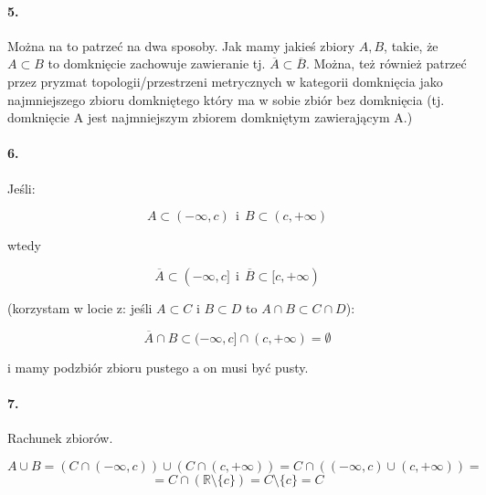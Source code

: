 \documentclass{article}
\begin{document}
\paragraph{5.}
Można na to patrzeć na dwa sposoby. Jak mamy jakieś zbiory \(A, B\), takie, że \(A \subset B\) to domknięcie zachowuje zawieranie tj.
\(\overline{A} \subset \overline{B}\). Można, też również patrzeć przez pryzmat topologii/przestrzeni metrycznych w kategorii
domknięcia jako najmniejszego zbioru domkniętego który ma w sobie zbiór bez domknięcia (tj. domknięcie A jest najmniejszym zbiorem domkniętym
zawierającym A.)

\paragraph{6.}

Jeśli:

\begin{equation*}
    A \subset (- \infty, c) \ \ \mbox{i} \ \ B \subset (c, + \infty)
\end{equation*}

wtedy 

\begin{equation*}
    \overline{A} \subset (- \infty, c] \ \ \mbox{i} \ \ \overline{B} \subset [c, + \infty)
\end{equation*}

(korzystam w locie z: jeśli \(A \subset C\) i \(B \subset D\) to \(A \cap B \subset C \cap D\)):

\begin{equation*}
    \overline{A} \cap B \subset (-\infty, c] \cap (c, + \infty) = \emptyset
\end{equation*}

i mamy podzbiór zbioru pustego a on musi być pusty.

\paragraph{7.}

Rachunek zbiorów.

\begin{equation*}
    A \cup B = (C \cap (-\infty, c)) \cup (C \cap (c, + \infty)) = C \cap ((-\infty, c) \cup (c, + \infty)) =
\end{equation*}
\begin{equation*}
    = C \cap (\mathbb{R} \setminus \{c\}) = C \setminus \{c\} = C
\end{equation*}
 
\end{document}
